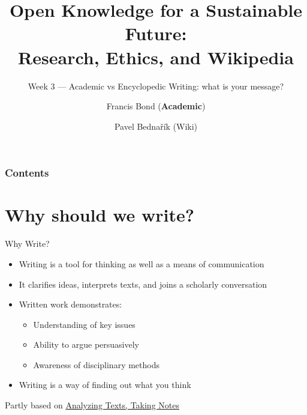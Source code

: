\documentclass[aspectratio=169]{beamer}
\title[What is your message?]{Open Knowledge for a Sustainable Future:\\ Research, Ethics, and Wikipedia}
\subtitle{Week 3 --- Academic vs Encyclopedic Writing: what is your message?}
\author[Bond \& Bednařík]{Francis Bond (\textbf{Academic}) \and Pavel Bednařík (Wiki)}
\institute[UPOL \& Wikimedia]{Palacký University Olomouc \quad | \quad Wikimedia ČR}
\date{}
\begin{document}
\begin{frame}
  \titlepage
\end{frame}

\begin{frame}
  \frametitle{Contents}
  \small
  \tableofcontents[hideallsubsections]
\end{frame}



\section{Why should we write?}

\begin{frame}{Why Write?}
\begin{itemize}
  \item Writing is a tool for thinking as well as a means of communication
  \item It clarifies ideas, interprets texts, and joins a scholarly conversation
  \item Written work demonstrates:
    \begin{itemize}
      \item Understanding of key issues
      \item Ability to argue persuasively
      \item Awareness of disciplinary methods
    \end{itemize}
  \item Writing is a way of finding out what you think
\end{itemize}
\vfill
Partly based on \href{https://mlpp.pressbooks.pub/writinghandbook/chapter/chapter-1/}{Analyzing Texts, Taking Notes} \citep[Ch.~1]{writinghandbook}
\end{frame}
\end{document}
